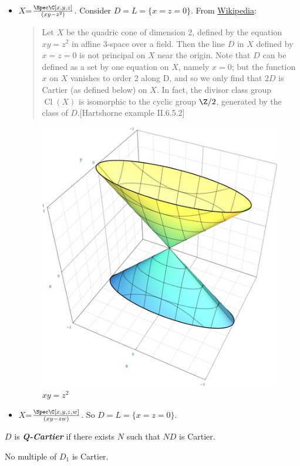 \begin{example}\leavevmode
	\begin{itemize}
		\item $X$=$\frac{\Spec\C[x,y,z]}{(xy-z^2)}$. Consider $D=L=\{x=z=0\}$. From \href{https://en.wikipedia.org/wiki/Divisor_(algebraic_geometry)}{Wikipedia}:
		
		\begin{quote}
			Let $X$ be the quadric cone of dimension 2, defined by the equation $xy = z^2$ in affine 3-space over a field. Then the line $D$ in $X$ defined by $x = z = 0$ is not principal on $X$ near the origin. Note that $D$ can be defined as a set by one equation on $X$, namely $x = 0$; but the function $x$ on $X$ vanishes to order 2 along D, and so we only find that $2D$ is Cartier (as defined below) on $X$. In fact, the divisor class group $\operatorname{Cl}(X)$ is isomorphic to the cyclic group $\Z/2$, generated by the class of $D$.[Hartshorne example II.6.5.2]
		\end{quote}
		\begin{figure}[H]
			\centering
			\includegraphics[width=0.4\linewidth]{divisor}
			\caption{$xy=z^2$}
			\label{fig:divisor}
		\end{figure}
		
		\item $X$=$\frac{\Spec\C[x,y,z,w]}{(xy-zw)}$. So $D=L=\{x=z=0\}$.
	\end{itemize}
\end{example}
\begin{defn}
	$D$ is \textbf{\textit{Q-Cartier}} if there exists $N$ such that $ND$ is Cartier.
\end{defn}
\begin{prop}
	No multiple of $D_1$ is Cartier.
\end{prop}


